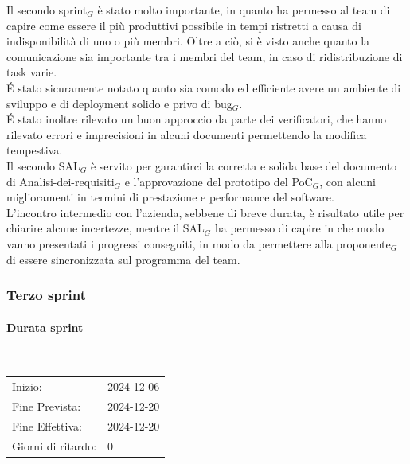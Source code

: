 \documentclass[10pt]{article}
\begin{document}
{{{    Il secondo sprint$_G$ è stato molto importante, in quanto ha permesso al team di capire come essere il più produttivi possibile in tempi ristretti a causa di indisponibilità di uno o più membri. Oltre a ciò, si è visto anche quanto la comunicazione sia importante tra i membri del team, in caso di ridistribuzione di task varie.\\ 
    \'E stato sicuramente notato quanto sia comodo ed efficiente avere un ambiente di sviluppo e di deployment solido e privo di bug$_G$.\\ 
    \'E stato inoltre rilevato un buon approccio da parte dei verificatori, che hanno rilevato errori e imprecisioni in alcuni documenti permettendo la modifica tempestiva.\\ 
    Il secondo SAL$_G$ è servito per garantirci la corretta e solida base del documento di Analisi-dei-requisiti$_G$ e l'approvazione del prototipo del PoC$_G$, con alcuni miglioramenti in termini di prestazione e performance del software.\\ 
    L'incontro intermedio con l'azienda, sebbene di breve durata, è risultato utile per chiarire alcune incertezze, mentre il SAL$_G$ ha permesso di capire in che modo vanno presentati i progressi conseguiti, in modo da permettere alla proponente$_G$ di essere sincronizzata sul programma del team.
    

\newpage
\subsubsection{Terzo sprint}
\label{terzo-sprint$_G$}
    
    \paragraph{Durata sprint}\mbox{}\\
    \vspace{-1.5em}
    \begin{table}[h] 
    \renewcommand{\arraystretch}{1.2}  
    \begin{tabular}{ l l }
        Inizio: & 2024-12-06 \\
        Fine Prevista: & 2024-12-20 \\
        Fine Effettiva: & 2024-12-20 \\
        Giorni di ritardo: & 0 \\
    \end{tabular}
    \end{table}
    \vspace{-2em}
    {\renewcommand{\arraystretch}{1.5}%
    
}}}}
\end{document}
